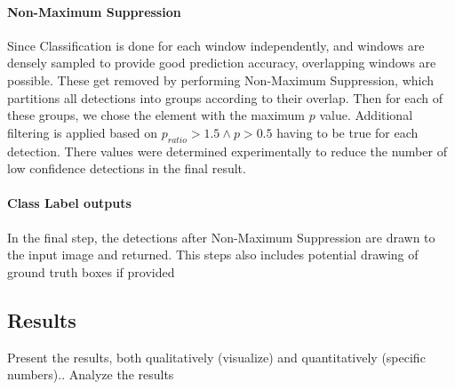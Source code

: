 \documentclass[11pt]{article}
\begin{document}
\paragraph{Non-Maximum Suppression}
Since Classification is done for each window independently, and windows are densely sampled to provide good prediction accuracy, 
overlapping windows are possible. These get removed by performing Non-Maximum Suppression, which partitions all detections into groups according to their overlap.
Then for each of these groups, we chose the element with the maximum \( p \) value. Additional filtering is applied based on \( p_{ratio} > 1.5 \wedge p > 0.5 \) having to be true for each detection.
There values were determined experimentally to reduce the number of low confidence detections in the final result.

\paragraph{Class Label outputs}
In the final step, the detections after Non-Maximum Suppression are drawn to the input image and returned. 
This steps also includes potential drawing of ground truth boxes if provided

\subsection{Results}\label{subsec:results}
Present the results, both qualitatively (visualize) and quantitatively (specific numbers)..
Analyze the results
\end{document}
